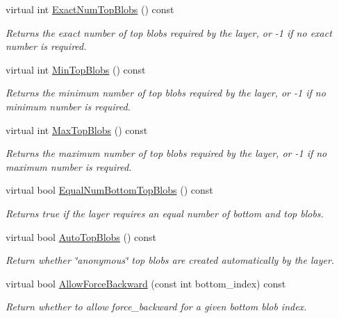 \begin{DoxyCompactItemize}
virtual int \mbox{\hyperlink{classcaffe_1_1_layer_a64e2ca72c719e4b2f1f9216ccfb0d37f}{Exact\+Num\+Top\+Blobs}} () const
\begin{DoxyCompactList}\small\item\em Returns the exact number of top blobs required by the layer, or -\/1 if no exact number is required. \end{DoxyCompactList}\item 
virtual int \mbox{\hyperlink{classcaffe_1_1_layer_ab9e4c8d642e413948b131d851a8462a4}{Min\+Top\+Blobs}} () const
\begin{DoxyCompactList}\small\item\em Returns the minimum number of top blobs required by the layer, or -\/1 if no minimum number is required. \end{DoxyCompactList}\item 
virtual int \mbox{\hyperlink{classcaffe_1_1_layer_ac6c03df0b6e40e776c94001e19994a2e}{Max\+Top\+Blobs}} () const
\begin{DoxyCompactList}\small\item\em Returns the maximum number of top blobs required by the layer, or -\/1 if no maximum number is required. \end{DoxyCompactList}\item 
virtual bool \mbox{\hyperlink{classcaffe_1_1_layer_af452a938bc7596f9b5e9900c8dc4ab3d}{Equal\+Num\+Bottom\+Top\+Blobs}} () const
\begin{DoxyCompactList}\small\item\em Returns true if the layer requires an equal number of bottom and top blobs. \end{DoxyCompactList}\item 
virtual bool \mbox{\hyperlink{classcaffe_1_1_layer_a50130669e230a168d1f8fbbb8171f054}{Auto\+Top\+Blobs}} () const
\begin{DoxyCompactList}\small\item\em Return whether \char`\"{}anonymous\char`\"{} top blobs are created automatically by the layer. \end{DoxyCompactList}\item 
virtual bool \mbox{\hyperlink{classcaffe_1_1_layer_a1c0b2bffcd6d57e4bd49f820941badb6}{Allow\+Force\+Backward}} (const int bottom\+\_\+index) const
\begin{DoxyCompactList}\small\item\em Return whether to allow force\+\_\+backward for a given bottom blob index. \end{DoxyCompactList}\item 

\end{DoxyCompactItemize}
